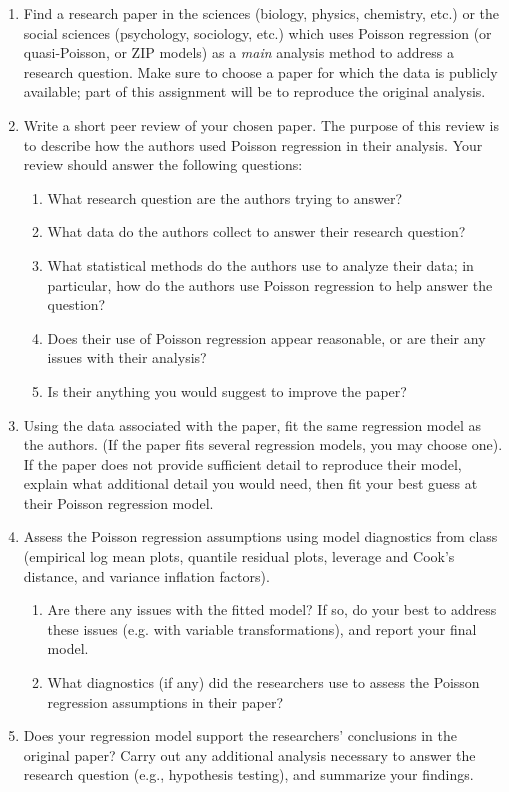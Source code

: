 \documentclass[11pt]{article}
\begin{document}
\begin{enumerate}
\item Find a research paper in the sciences (biology, physics, chemistry, etc.) or the social sciences (psychology, sociology, etc.) which uses Poisson regression (or quasi-Poisson, or ZIP models) as a \textit{main} analysis method to address a research question. Make sure to choose a paper for which the data is publicly available; part of this assignment will be to reproduce the original analysis.

\item Write a short peer review of your chosen paper. The purpose of this review is to describe how the authors used Poisson regression in their analysis. Your review should answer the following questions:
\begin{enumerate}
\item What research question are the authors trying to answer?
\item What data do the authors collect to answer their research question?
\item What statistical methods do the authors use to analyze their data; in particular, how do the authors use Poisson regression to help answer the question?
\item Does their use of Poisson regression appear reasonable, or are their any issues with their analysis?
\item Is their anything you would suggest to improve the paper?
\end{enumerate}

\item Using the data associated with the paper, fit the same regression model as the authors. (If the paper fits several regression models, you may choose one). If the paper does not provide sufficient detail to reproduce their model, explain what additional detail you would need, then fit your best guess at their Poisson regression model.

\item Assess the Poisson regression assumptions using model diagnostics from class (empirical log mean plots, quantile residual plots, leverage and Cook's distance, and variance inflation factors).

\begin{enumerate}
\item Are there any issues with the fitted model? If so, do your best to address these issues (e.g. with variable transformations), and report your final model.

\item What diagnostics (if any) did the researchers use to assess the Poisson regression assumptions in their paper?
\end{enumerate}

\item Does your regression model support the researchers' conclusions in the original paper? Carry out any additional analysis necessary to answer the research question (e.g., hypothesis testing), and summarize your findings.

\end{enumerate}
\end{document}
